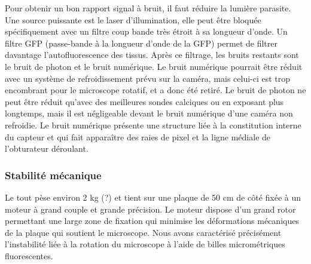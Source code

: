 Pour obtenir un bon rapport signal à bruit, il faut réduire la lumière parasite. Une source puissante est le laser d'illumination, elle peut être bloquée spécifiquement avec un filtre coup bande très étroit à sa longueur d'onde. Un filtre GFP (passe-bande à la longueur d'onde de la GFP) permet de filtrer davantage l'autofluorescence des tissus. Après ce filtrage, les bruits restants sont le bruit de photon et le bruit numérique. Le bruit numérique pourrait être réduit avec un système de refroidissement prévu sur la caméra, mais celui-ci est trop encombrant pour le microscope rotatif, et a donc été retiré. Le bruit de photon ne peut être réduit qu'avec des meilleures sondes calciques ou en exposant plus longtemps, mais il est négligeable devant le bruit numérique d'une caméra non refroidie. Le bruit numérique présente une structure liée à la constitution interne du capteur et qui fait apparaître des raies de pixel et la ligne médiale de l'obturateur déroulant.



\subsubsection{Stabilité mécanique}

Le tout pèse environ 2 kg (?) et tient sur une plaque de 50 cm de côté fixée à un moteur à grand couple et grande précision. Le moteur dispose d'un grand rotor permettant une large zone de fixation qui minimise les déformations mécaniques de la plaque qui soutient le microscope. Nous avons caractérisé précisément l'instabilité liée à la rotation du microscope à l'aide de billes micrométriques fluorescentes.

